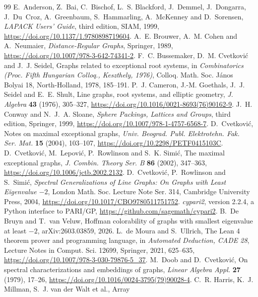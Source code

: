 \documentclass[11pt]{article}
\theoremstyle{definition}
\begin{document}
\FloatBarrier
\begin{thebibliography}{99}
 E.~Anderson, Z.~Bai, C.~Bischof, L.~S. Blackford, J.~Demmel,
J.~Dongarra, J.~Du~Croz, A.~Greenbaum, S.~Hammarling, A.~McKenney and D.~Sorensen,
\textsl{LAPACK Users' Guide}, third edition, SIAM, 1999, \url{https://doi.org/10.1137/1.9780898719604}.
 A.~E. Brouwer, A.~M. Cohen and A.~Neumaier, \textsl{Distance-Regular
Graphs}, Springer, 1989, \url{https://doi.org/10.1007/978-3-642-74341-2}.
 F.~C. Bussemaker, D.~M. Cvetkovi\'c and J.~J. Seidel, Graphs related to
exceptional root systems, in \textsl{Combinatorics (Proc. Fifth Hungarian Colloq., Keszthely,
1976)}, Colloq. Math. Soc. J\'anos Bolyai 18, North-Holland, 1978, 185--191.
 P.~J. Cameron, J.-M. Goethals, J.~J. Seidel and E.~E. Shult, Line graphs,
root systems, and elliptic geometry, \textsl{J. Algebra} \textbf{43} (1976), 305--327, \url{https://doi.org/10.1016/0021-8693(76)90162-9}.
 J.~H. Conway and N.~J.~A. Sloane, \textsl{Sphere Packings, Lattices and
Groups}, third edition, Springer, 1999, \url{https://doi.org/10.1007/978-1-4757-6568-7}.
 D.~Cvetkovi\'c, Notes on maximal exceptional graphs, \textsl{Univ. Beograd.
Publ. Elektrotehn. Fak. Ser. Mat.} \textbf{15} (2004), 103--107, \url{https://doi.org/10.2298/PETF0415103C}.
 D.~Cvetkovi\'c, M.~Lepovi\'c, P.~Rowlinson and S.~K. Simi\'c, The
maximal exceptional graphs, \textsl{J. Combin. Theory Ser. B} \textbf{86} (2002), 347--363, \url{https://doi.org/10.1006/jctb.2002.2132}.
 D.~Cvetkovi\'c, P.~Rowlinson and S.~Simi\'c, \textsl{Spectral
Generalizations of Line Graphs: On Graphs with Least Eigenvalue $-2$}, London Math. Soc.
Lecture Note Ser. 314, Cambridge University Press, 2004, \url{https://doi.org/10.1017/CBO9780511751752}.
 \textsl{cypari2}, version 2.2.4, a Python interface to PARI/GP,
\url{https://github.com/sagemath/cypari2}.
 B.~De Bruyn and T.~van Veluw, Hoffman colorability of graphs with
smallest eigenvalue at least $-2$, arXiv:2603.03859, 2026.
 L.~de Moura and S.~Ullrich, The Lean 4 theorem prover and programming
language, in \textsl{Automated Deduction, CADE 28}, Lecture Notes in Comput. Sci. 12699, Springer,
2021, 625--635, \url{https://doi.org/10.1007/978-3-030-79876-5_37}.
 M.~Doob and D.~Cvetkovi\'c, On spectral characterizations and embeddings of
graphs, \textsl{Linear Algebra Appl.} \textbf{27} (1979), 17--26, \url{https://doi.org/10.1016/0024-3795(79)90028-4}.
 C.~R. Harris, K.~J. Millman, S.~J. van der Walt et al., Array

\end{thebibliography}
\end{document}
